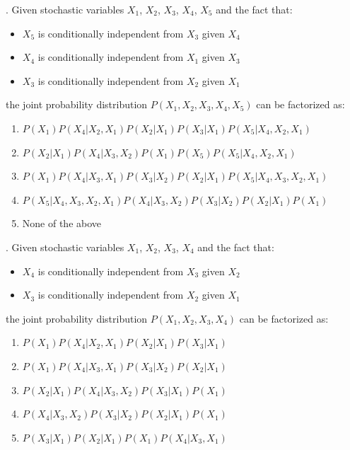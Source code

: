 . Given stochastic variables $X_1$, $X_2$, $X_3$, $X_4$, $X_5$ and the fact that:

\begin{itemize}
    \item $X_5$ is conditionally independent from $X_3$ given $X_4$
    \item $X_4$ is conditionally independent from $X_1$ given $X_3$
    \item $X_3$ is conditionally independent from $X_2$ given $X_1$
\end{itemize}

\noindent the joint probability distribution $P(X_1, X_2, X_3, X_4, X_5)$ can be factorized as:
\begin{enumerate}[label=\roman*]
    \item $P(X_1)P(X_4 | X_2, X_1)P(X_2 |X_1) P(X_3 | X_1) P(X_5 | X_4, X_2, X_1)$
    \item $P(X_2 | X_1) P(X_4 | X_3, X_2) P(X_1) P(X_5) P(X_5 | X_4, X_2, X_1)$
    \item $P(X_1) P(X_4 | X_3, X_1) P(X_3 | X_2) P(X_2 | X_1) P(X_5 | X_4, X_3, X_2, X_1)$
    \item $ P(X_5 | X_4, X_3, X_2, X_1) P(X_4| X_3, X_2) P(X_3 | X_2) P(X_2 | X_1) P(X_1)$
    \item None of the above
\end{enumerate}


. Given stochastic variables $X_1$, $X_2$, $X_3$, $X_4$ and the fact that:

\begin{itemize}
    \item $X_4$ is conditionally independent from $X_3$ given $X_2$
    \item $X_3$ is conditionally independent from $X_2$ given $X_1$
\end{itemize}

\noindent the joint probability distribution $P(X_1, X_2, X_3, X_4)$ can be factorized as:
\begin{enumerate}[label=\roman*]
    \item $P(X_1)P(X_4 | X_2, X_1)P(X_2 | X_1) P(X_3 | X_1)$
    \item $P(X_1) P(X_4 | X_3, X_1) P(X_3 | X_2) P(X_2 | X_1)$
    \item $P(X_2 | X_1) P(X_4 | X_3, X_2) P(X_3 | X_1) P(X_1)$
    \item $P(X_4 | X_3, X_2) P(X_3 | X_2) P(X_2 | X_1) P(X_1)$
    \item $P(X_3 | X_1) P(X_2 | X_1) P(X_1) P(X_4 | X_3, X_1)$
\end{enumerate}


